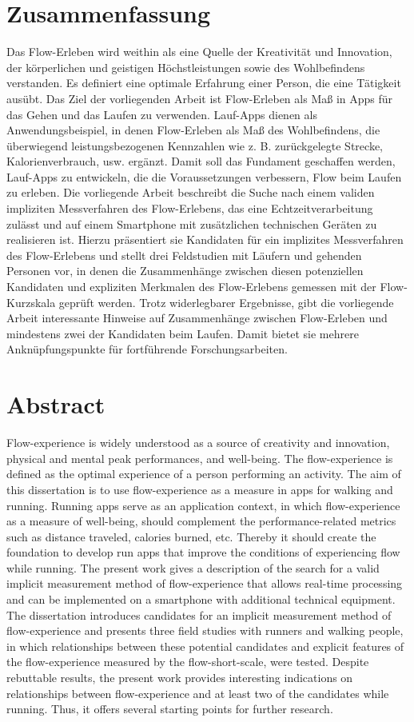 \section*{Zusammenfassung}
Das Flow-Erleben wird weithin als eine Quelle der Kreativität und Innovation, der körperlichen und geistigen Höchstleistungen sowie des Wohlbefindens verstanden. Es definiert eine optimale Erfahrung einer Person, die eine Tätigkeit ausübt. Das Ziel der vorliegenden Arbeit ist Flow-Erleben als Maß in Apps für das Gehen und das Laufen zu verwenden. Lauf-Apps dienen als Anwendungsbeispiel, in denen Flow-Erleben als Maß des Wohlbefindens, die überwiegend leistungsbezogenen Kennzahlen wie z. B. zurückgelegte Strecke, Kalorienverbrauch, usw. ergänzt. Damit soll das Fundament geschaffen werden, Lauf-Apps zu entwickeln, die die Voraussetzungen verbessern, Flow beim Laufen zu erleben. Die vorliegende Arbeit beschreibt die Suche nach einem validen impliziten Messverfahren des Flow-Erlebens, das eine Echtzeitverarbeitung zulässt und auf einem Smartphone mit zusätzlichen technischen Geräten zu realisieren ist. Hierzu präsentiert sie Kandidaten für ein implizites Messverfahren des Flow-Erlebens und stellt drei Feldstudien mit Läufern und gehenden Personen vor, in denen die Zusammenhänge zwischen diesen potenziellen Kandidaten und expliziten Merkmalen des Flow-Erlebens gemessen mit der Flow-Kurzskala geprüft werden. Trotz widerlegbarer Ergebnisse, gibt die vorliegende Arbeit interessante Hinweise auf Zusammenhänge zwischen Flow-Erleben und mindestens zwei der Kandidaten beim Laufen. Damit bietet sie mehrere Anknüpfungspunkte für fortführende Forschungsarbeiten. 
\pagebreak

\section*{Abstract}
Flow-experience is widely understood as a source of creativity and innovation, physical and mental peak performances, and well-being. The flow-experience is defined as the optimal experience of a person performing an activity. The aim of this dissertation is to use flow-experience as a measure in apps for walking and running. Running apps serve as an application context, in which flow-experience as a measure of well-being, should complement the performance-related metrics such as distance traveled, calories burned, etc. Thereby it should create the foundation to develop run apps that improve the conditions of experiencing flow while running. The present work gives a description of the search for a valid implicit measurement method of flow-experience that allows real-time processing and can be implemented on a smartphone with additional technical equipment. The dissertation introduces candidates for an implicit measurement method of flow-experience and presents three field studies with runners and walking people, in which relationships between these potential candidates and explicit features of the flow-experience measured by the flow-short-scale, were tested. Despite rebuttable results, the present work provides interesting indications on relationships between flow-experience and at least two of the candidates while running. Thus, it offers several starting points for further research. 